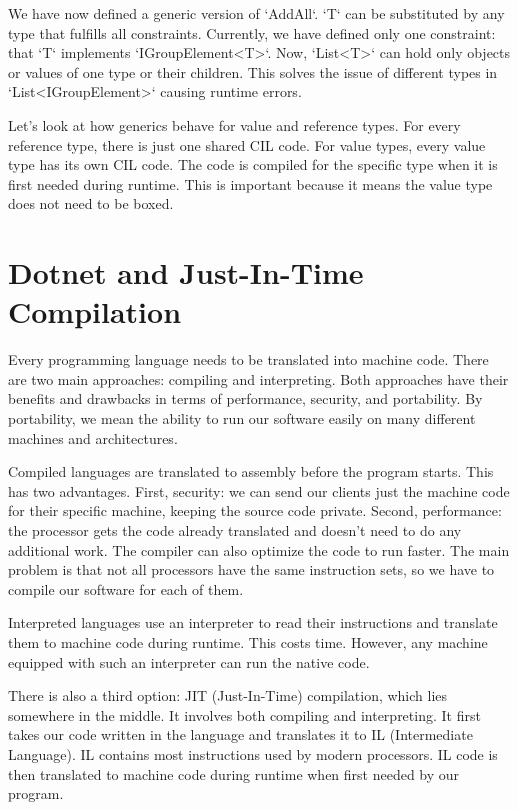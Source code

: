 We have now defined a generic version of `AddAll`. `T` can be substituted by any type that fulfills all constraints. Currently, we have defined only one constraint: that `T` implements `IGroupElement<T>`. Now, `List<T>` can hold only objects or values of one type or their children. This solves the issue of different types in `List<IGroupElement>` causing runtime errors.

Let's look at how generics behave for value and reference types. For every reference type, there is just one shared CIL code. For value types, every value type has its own CIL code. The code is compiled for the specific type when it is first needed during runtime. This is important because it means the value type does not need to be boxed. \cite{Generics1}

\section{Dotnet and Just-In-Time Compilation}

Every programming language needs to be translated into machine code. There are two main approaches: compiling and interpreting. Both approaches have their benefits and drawbacks in terms of performance, security, and portability. By portability, we mean the ability to run our software easily on many different machines and architectures.

Compiled languages are translated to assembly before the program starts. This has two advantages. First, security: we can send our clients just the machine code for their specific machine, keeping the source code private. Second, performance: the processor gets the code already translated and doesn't need to do any additional work. The compiler can also optimize the code to run faster. The main problem is that not all processors have the same instruction sets, so we have to compile our software for each of them.

Interpreted languages use an interpreter to read their instructions and translate them to machine code during runtime. This costs time. However, any machine equipped with such an interpreter can run the native code.

There is also a third option: JIT (Just-In-Time) compilation, which lies somewhere in the middle. It involves both compiling and interpreting. It first takes our code written in the language and translates it to IL (Intermediate Language). IL contains most instructions used by modern processors. IL code is then translated to machine code during runtime when first needed by our program.

